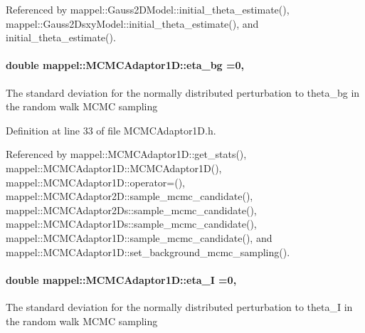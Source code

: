 Referenced by mappel\+::\+Gauss2\+D\+Model\+::initial\+\_\+theta\+\_\+estimate(), mappel\+::\+Gauss2\+Dsxy\+Model\+::initial\+\_\+theta\+\_\+estimate(), and initial\+\_\+theta\+\_\+estimate().

\paragraph[{\texorpdfstring{eta\+\_\+bg}{eta_bg}}]{\setlength{\rightskip}{0pt plus 5cm}double mappel\+::\+M\+C\+M\+C\+Adaptor1\+D\+::eta\+\_\+bg =0\hspace{0.3cm}{\ttfamily [protected]}, {\ttfamily [inherited]}}\hypertarget{classmappel_1_1MCMCAdaptor1D_af54c93421b8e298289cbb92743c6b3d5}{}\label{classmappel_1_1MCMCAdaptor1D_af54c93421b8e298289cbb92743c6b3d5}
The standard deviation for the normally distributed perturbation to theta\+\_\+bg in the random walk M\+C\+MC sampling 

Definition at line 33 of file M\+C\+M\+C\+Adaptor1\+D.\+h.



Referenced by mappel\+::\+M\+C\+M\+C\+Adaptor1\+D\+::get\+\_\+stats(), mappel\+::\+M\+C\+M\+C\+Adaptor1\+D\+::\+M\+C\+M\+C\+Adaptor1\+D(), mappel\+::\+M\+C\+M\+C\+Adaptor1\+D\+::operator=(), mappel\+::\+M\+C\+M\+C\+Adaptor2\+D\+::sample\+\_\+mcmc\+\_\+candidate(), mappel\+::\+M\+C\+M\+C\+Adaptor2\+Ds\+::sample\+\_\+mcmc\+\_\+candidate(), mappel\+::\+M\+C\+M\+C\+Adaptor1\+Ds\+::sample\+\_\+mcmc\+\_\+candidate(), mappel\+::\+M\+C\+M\+C\+Adaptor1\+D\+::sample\+\_\+mcmc\+\_\+candidate(), and mappel\+::\+M\+C\+M\+C\+Adaptor1\+D\+::set\+\_\+background\+\_\+mcmc\+\_\+sampling().

\paragraph[{\texorpdfstring{eta\+\_\+I}{eta_I}}]{\setlength{\rightskip}{0pt plus 5cm}double mappel\+::\+M\+C\+M\+C\+Adaptor1\+D\+::eta\+\_\+I =0\hspace{0.3cm}{\ttfamily [protected]}, {\ttfamily [inherited]}}\hypertarget{classmappel_1_1MCMCAdaptor1D_a5780d326be0c40e10d6c91777cfffbd3}{}\label{classmappel_1_1MCMCAdaptor1D_a5780d326be0c40e10d6c91777cfffbd3}
The standard deviation for the normally distributed perturbation to theta\+\_\+I in the random walk M\+C\+MC sampling 

